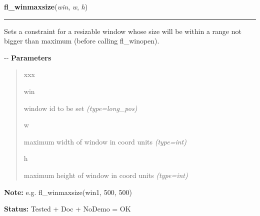 \hspace{.8\funcindent}\begin{boxedminipage}{\funcwidth}

    \raggedright \textbf{fl\_winmaxsize}(\textit{win}, \textit{w}, \textit{h})

    \vspace{-1.5ex}

    \rule{\textwidth}{0.5\fboxrule}
\setlength{\parskip}{2ex}

Sets a constraint for a resizable window whose size will be within a
range not bigger than maximum (before calling fl\_winopen).

-{}-
\setlength{\parskip}{1ex}
      \textbf{Parameters}
      \vspace{-1ex}

      \begin{quote}
        \begin{Ventry}{xxx}

          \item[win]


window id to be set
            {\it (type=long\_pos)}

          \item[w]


maximum width of window in coord units
            {\it (type=int)}

          \item[h]


maximum height of window in coord units
            {\it (type=int)}

        \end{Ventry}

      \end{quote}

\textbf{Note:} 
e.g. fl\_winmaxsize(win1, 500, 500)


\textbf{Status:} 
Tested + Doc + NoDemo = OK


    \end{boxedminipage}

    \label{xformslib:flxbasic:fl_winaspect}

    \vspace{0.5ex}

